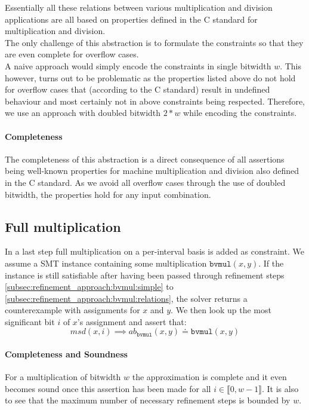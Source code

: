 Essentially all these relations between various multiplication and division applications are all based
on properties defined in the C standard \cite{ISO14882:2011} for multiplication and division.\\
The only challenge of this abstraction is to formulate the constraints so that they are even complete for overflow cases.\\
A naive approach would simply encode the constraints in single bitwidth $w$.
This however, turns out to be problematic as the properties listed above do not hold for overflow cases that (according to the C standard) 
result in undefined behaviour and most certainly not in above constraints being respected.
Therefore, we use an approach with doubled bitwidth $2*w$ while encoding the constraints.

\paragraph{Completeness}
The completeness of this abstraction is a direct consequence of all assertions being well-known properties for machine multiplication and division also defined in the C standard. As we avoid all overflow cases through the use of doubled bitwidth, the properties hold for any input combination.

\subsection{Full multiplication}
\label{subsec:refinement_approach:bvmul:fullmul}
In a last step full multiplication on a per-interval basis is added as constraint.
We assume a SMT instance containing some multiplication $\texttt{bvmul}\left(x,y\right)$. 
If the instance is still satisfiable after having been passed through refinement steps
\ref{subsec:refinement_approach:bvmul:simple} to \ref{subsec:refinement_approach:bvmul:relations}, the solver returns a counterexample with assignments for $x$ and $y$.
We then look up the most significant bit $i$ of $x$'s assignment and assert that:
\[
    msd\left(x,i\right) \implies ab_{\texttt{bvmul}}\left(x,y\right) \doteq \texttt{bvmul}\left(x,y\right)
\]
\paragraph{Completeness and Soundness}
For a multiplication of bitwidth $w$ the approximation is complete and it even becomes sound once this assertion has been made
for all $i\in\llbracket 0,w-1\rrbracket$. It is also to see that the maximum number of necessary refinement steps is bounded by $w$.

